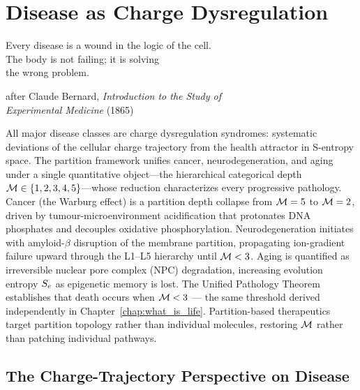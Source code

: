 
\chapter{Disease as Charge Dysregulation}
\label{chap:disease_dysregulation}

\epigraph{%
  Every disease is a wound in the logic of the cell.\\
  The body is not failing; it is solving\\
  the wrong problem.%
}{after Claude Bernard, \textit{Introduction to the Study of\\
  Experimental Medicine} (1865)}

\begin{chapterbox}
All major disease classes are charge dysregulation syndromes: systematic
deviations of the cellular charge trajectory from the health attractor in
S-entropy space. The partition framework unifies cancer, neurodegeneration,
and aging under a single quantitative object---the hierarchical categorical
depth $\mathcal{M} \in \{1,2,3,4,5\}$---whose reduction characterizes every
progressive pathology. Cancer (the Warburg effect) is a partition depth
collapse from $\mathcal{M} = 5$ to $\mathcal{M} = 2$, driven by tumour-microenvironment
acidification that protonates DNA phosphates and decouples oxidative
phosphorylation. Neurodegeneration initiates with amyloid-$\beta$ disruption
of the membrane partition, propagating ion-gradient failure upward through
the L1--L5 hierarchy until $\mathcal{M} < 3$. Aging is quantified as
irreversible nuclear pore complex (NPC) degradation, increasing evolution
entropy $S_e$ as epigenetic memory is lost. The Unified Pathology Theorem
establishes that death occurs when $\mathcal{M} < 3$ --- the same threshold derived
independently in Chapter~\ref{chap:what_is_life}. Partition-based therapeutics
target partition topology rather than individual molecules, restoring $\mathcal{M}$
rather than patching individual pathways.
\end{chapterbox}

\section{The Charge-Trajectory Perspective on Disease}
\label{sec:disease_perspective}

